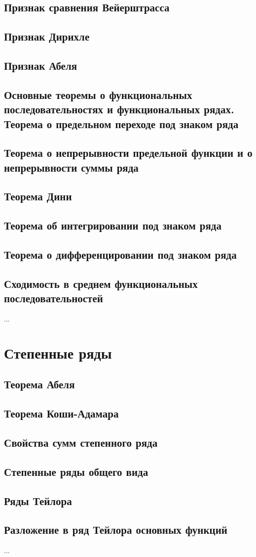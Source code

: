 \subsection{Признак сравнения Вейерштрасса}
\subsection{Признак Дирихле}
\subsection{Признак Абеля}
\subsection{Основные теоремы о  функциональных последовательностях и функциональных рядах. Теорема о предельном переходе под знаком ряда}
\subsection{Теорема о непрерывности предельной функции и о непрерывности суммы ряда}
\subsection{Теорема Дини}
\subsection{Теорема об интегрировании под знаком ряда}
\subsection{Теорема о дифференцировании под знаком ряда}
\subsection{Сходимость в среднем функциональных последовательностей}
...

\section{Степенные ряды}
\subsection{Теорема Абеля}
\subsection{Теорема Коши-Адамара}
\subsection{Свойства сумм степенного ряда}

\subsection{Степенные ряды общего вида}
\subsection{Ряды Тейлора}
\subsection{Разложение в ряд Тейлора основных функций}
...

